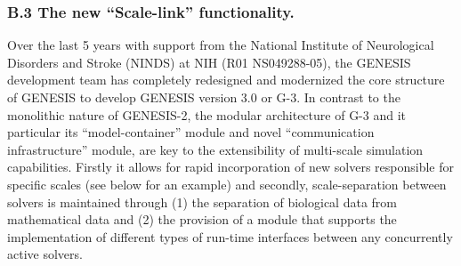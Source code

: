\documentclass[12pt]{article}
\begin{document}
\subsubsection*{B.3 The new ``Scale-link'' functionality.}

\noindent Over the last 5 years with support from the National
Institute of Neurological Disorders and Stroke (NINDS) at NIH (R01
NS049288-05), the GENESIS development team has completely redesigned
and modernized the core structure of GENESIS to develop GENESIS
version 3.0 or G-3.  In contrast to the monolithic nature of
GENESIS-2, the modular architecture of G-3 and it particular its
``model-container'' module and novel ``communication infrastructure''
module, are key to the extensibility of multi-scale simulation
capabilities.  Firstly it allows for rapid incorporation of new
solvers responsible for specific scales (see below for an example) and
secondly, scale-separation between solvers is maintained through (1)
the separation of biological data from mathematical data and (2) the
provision of a module that supports the implementation of different
types of run-time interfaces between any concurrently active solvers.


\end{document}
